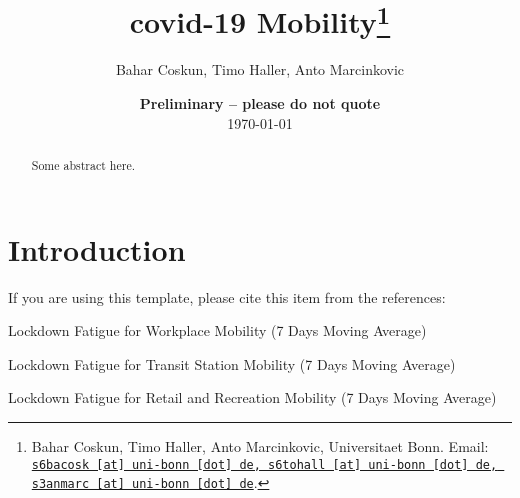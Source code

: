 \documentclass[11pt, a4paper, leqno]{article}
\begin{document}
\title{covid-19 Mobility\thanks{Bahar Coskun, Timo Haller, Anto Marcinkovic, Universitaet Bonn. Email: \href{mailto:s6bacosk@uni-bonn.de, s6tohall@uni-bonn.de, s3anmarc@uni-bonn.de}{\nolinkurl{s6bacosk [at] uni-bonn [dot] de, s6tohall [at] uni-bonn [dot] de, s3anmarc [at] uni-bonn [dot] de}}.}}

\author{Bahar Coskun, Timo Haller, Anto Marcinkovic}

\date{
    {\bf Preliminary -- please do not quote}
    \\[1ex]
    \today
}

\maketitle


\begin{abstract}
    Some abstract here.
\end{abstract}
\clearpage

\tableofcontents
\clearpage

\section{Introduction} %
\label{sec:introduction}

If you are using this template, please cite this item from the references: \citet{GaudeckerEconProjectTemplates}


\newpage

\begin{table}
	\centering
	\caption{Lockdown Fatigue for Workplace Mobility (7 Days Moving Average)}
	\scalebox{0.8}{%
	
}

\end{table}


\newpage

\begin{table}
	\centering
	\caption{Lockdown Fatigue for Transit Station Mobility (7 Days Moving Average)}
	\scalebox{0.8}{%
		
	}
\end{table}

\newpage

\begin{table}
	\centering
	\caption{Lockdown Fatigue for Retail and Recreation Mobility (7 Days Moving Average)}
	\scalebox{0.8}{%
		
	}
\end{table}
\end{document}
